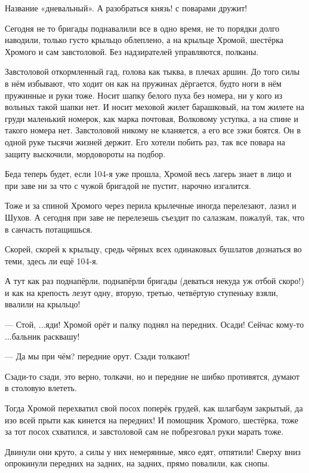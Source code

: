 Название \dash «дневальный». А разобраться \dash князь! \dash с поварами дружит!

Сегодня не то бригады поднавалили все в одно время, не то порядки долго наводили, только
густо крыльцо облеплено, а на крыльце Хромой, шестёрка Хромого и сам завстоловой. Без
надзирателей управляются, полканы.

Завстоловой \dash откормленный гад, голова как тыква, в плечах аршин. До того силы в нём
избывают, что ходит он \dash как на пружинах дёргается, будто ноги в нём пружинные и руки тоже.
Носит шапку белого пуха без номера, ни у кого из вольных такой шапки нет. И носит меховой
жилет барашковый, на том жилете на груди \dash маленький номерок, как марка почтовая, \dash
Волковому уступка, а на спине и такого номера нет. Завстоловой никому не кланяется, а его все
зэки боятся. Он в одной руке тысячи жизней держит. Его хотели побить раз, так все повара на
защиту выскочили, мордовороты на подбор.

Беда теперь будет, если 104-я уже прошла, \dash Хромой весь лагерь знает в лицо и при заве ни за что
с чужой бригадой не пустит, нарочно изгалится.

Тоже и за спиной Хромого через перила крылечные иногда перелезают, лазил и Шухов. А сегодня
при заве не перелезешь \dash съездит по салазкам, пожалуй, так, что в санчасть потащишься.

Скорей, скорей к крыльцу, средь чёрных всех одинаковых бушлатов дознаться во теми, здесь ли
ещё 104-я.

А тут как раз поднапёрли, поднапёрли бригады (деваться некуда \dash уж отбой скоро!) и как на
крепость лезут \dash одну, вторую, третью, четвёртую ступеньку взяли, ввалили на крыльцо!

--- Стой, ...яди! \dash Хромой орёт и палку поднял на передних. \Dash Осади! Сейчас кому-то ...бальник
расквашу!

--- Да мы при чём? \dash передние орут. \Dash Сзади толкают!

Сзади-то сзади, это верно, толкачи, но и передние не шибко противятся, думают в столовую
влететь.

Тогда Хромой перехватил свой посох поперёк грудей, как шлагбаум закрытый, да изо всей прыти
как кинется на передних! И помощник Хромого, шестёрка, тоже за тот посох схватился, и
завстоловой сам не побрезговал руки марать \dash тоже.

Двинули они круто, а силы у них немерянные, мясо едят, \dash отпятили! Сверху вниз опрокинули
передних на задних, на задних, прямо повалили, как снопы.

